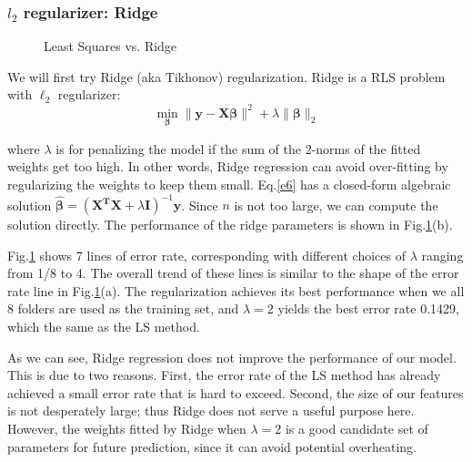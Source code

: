 \documentclass[10pt,letterpaper]{article}
\begin{document}
\subsubsection{$l_2$ regularizer: Ridge}

\begin{figure}[!ht]
    \centering
    \qquad
    \caption{Least Squares vs. Ridge}%
    \label{f4}%
\end{figure}

We will first try Ridge (aka Tikhonov) regularization. Ridge is a RLS problem with $\ell_2$ regularizer: 
\begin{equation}\label{e6}
\min\limits_{\boldsymbol \beta} \| \boldsymbol{y} - \mathbf{X}\mathbf{\boldsymbol \beta}\|^2 + \lambda \|\mathbf{\boldsymbol \beta}\|_2
\end{equation}

\noindent where $\lambda$ is for penalizing the model if the sum of the 2-norms of the fitted weights get too high. In other words, Ridge regression can avoid over-fitting by regularizing the weights to keep them small. Eq.\ref{e6} has a closed-form algebraic solution $\mathbf{\hat{\boldsymbol\beta}} = (\boldsymbol{X^{T}X} + \lambda \boldsymbol{I})^{-1}\boldsymbol{y}$. Since $n$ is not too large, we can compute the solution directly. The performance of the ridge parameters is shown in Fig.\ref{f4}(b). 

Fig.\ref{f4} shows 7 lines of error rate, corresponding with different choices of $\lambda$ ranging from 1/8 to 4. The overall trend of these lines is similar to the shape of the error rate line in Fig.\ref{f4}(a). The regularization achieves its best performance when we all 8 folders are used as the training set, and $\lambda = 2$ yields the best error rate 0.1429, which the same as the LS method. 

As we can see, Ridge regression does not improve the performance of our model. This is due to two reasons. First, the error rate of the LS method has already achieved a small error rate that is hard to exceed. Second, the size of our features is not desperately large; thus Ridge does not serve a useful purpose here. However, the weights fitted by Ridge when $\lambda = 2$ is a good candidate set of parameters for future prediction, since it can avoid potential overheating. 
\end{document}
